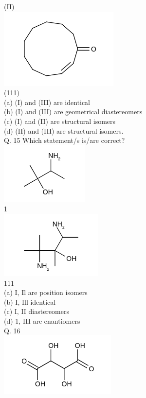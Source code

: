 \documentclass[10pt]{article}
\begin{document}
(II)\\
\includegraphics{smile-396c4d283684748b859196e941d588556bf17b84}\\
(111)\\
(a) (I) and (III) are identical\\
(b) (I) and (III) are geometrical diastereomers\\
(c) (I) and (II) are structural isomers\\
(d) (II) and (III) are structural isomers.\\
Q. 15 Which statement/s is/are correct?\\
\includegraphics{smile-70745fdbc9853799f4bb9897e52e4d3848928eab}\\
1\\
\includegraphics{smile-ad65c67f841a1e5c5875bfc1c6c3e4c0d118f61f}\\
111\\
(a) I, Il are position isomers\\
(b) I, Ill identical\\
(c) I, II diastereomers\\
(d) 1, III are enantiomers\\
Q. 16\\
\includegraphics{smile-cba5d2e87cc7f150a72827087c020d54bbd6d148}\\
\end{document}
